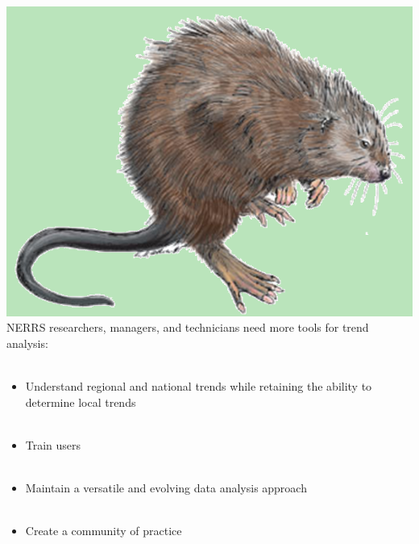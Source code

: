 \documentclass[serif]{beamer}\usepackage[]{graphicx}\usepackage[]{color}
\begin{document}
\begin{frame}{\includegraphics[width=0.05\paperwidth]{fig/muskrat.png}\hspace{0.07in}{\bf What are the needs?}}
NERRS researchers, managers, and technicians need more tools for trend analysis: \\~\\
\begin{itemize}
\item Understand regional and national trends while retaining the ability to determine local trends \\~\\
\item Train users \\~\\
\item Maintain a versatile and evolving data analysis approach \\~\\
\item Create a community of practice
\end{itemize}
\end{frame}
\end{document}
